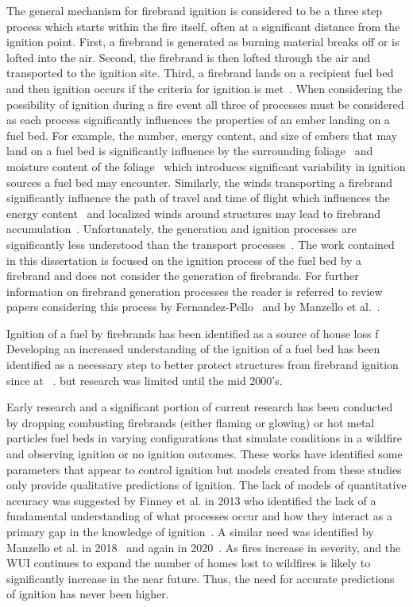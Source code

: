     The general mechanism for firebrand ignition is considered to be a three step process which starts within the fire itself, often at a significant distance from the ignition point. First, a firebrand is generated as burning material breaks off or is lofted into the air. Second, the firebrand is then lofted through the air and transported to the ignition site. Third, a firebrand lands on a recipient fuel bed and then ignition occurs if the criteria for ignition is met~\cite{Babrauskas2003}. When considering the possibility of ignition during a fire event all three of processes must be considered as each process significantly influences the properties of an ember landing on a fuel bed. For example, the number, energy content, and size of embers that may land on a fuel bed is significantly influence by the surrounding foliage~\cite{Hudson2020EffectsScale} and moisture content of the foliage~\cite{Adusumilli2021FirebrandShrub} which introduces significant variability in ignition sources a fuel bed may encounter. Similarly, the winds transporting a firebrand significantly influence the path of travel and time of flight which influences the energy content~\cite{Sardoy2007, MatvienkoOVA2016} and localized winds around structures may lead to firebrand accumulation~\cite{Suzuki2020a, Suzuki2017, Suzuki2015}. Unfortunately, the generation and ignition processes are significantly less understood than the transport processes~\cite{Manzello2020}. The work contained in this dissertation is focused on the ignition process of the fuel bed by a firebrand and does not consider the generation of firebrands. For further information on firebrand generation processes the reader is referred to review papers considering this process by Fernandez-Pello~\cite{Fernandez-Pello2017} and by Manzello et al.~\cite{Manzello2020}.
    
    
    Ignition of a fuel by firebrands has been identified as a source of house loss f
    Developing an increased understanding of the ignition of a fuel bed has been identified as a necessary step to better protect structures from firebrand ignition since at  ~\cite{Waterman1969ExperiemntalGeneration}. but research was limited until the mid 2000's.
    
    Early research and a significant portion of current research has been conducted by dropping combusting firebrands (either flaming or glowing) or hot metal particles fuel beds in varying configurations that simulate conditions in a wildfire and observing ignition or no ignition outcomes. These works have identified some parameters that appear to control ignition but models created from these studies only provide qualitative predictions of ignition. The lack of models of quantitative accuracy was suggested by Finney et al. in 2013 who identified the lack of a fundamental understanding of what processes occur and how they interact as a primary gap in the knowledge of ignition~\cite{Finney2013}. A similar need was identified by Manzello et al. in 2018~\cite{Manzello2018} and again in 2020~\cite{Manzello2020}. As fires increase in severity, and the WUI continues to expand the number of homes lost to wildfires is likely to significantly increase in the near future. Thus, the need for accurate predictions of ignition has never been higher. 
    
